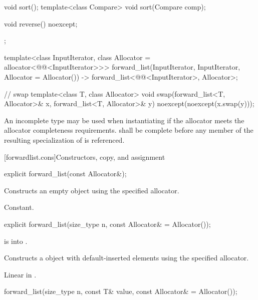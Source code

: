 \begin{codeblock}
{{    void sort();
    template<class Compare> void sort(Compare comp);

    void reverse() noexcept;
  };

  template<class InputIterator, class Allocator = allocator<@@<InputIterator>>>
    forward_list(InputIterator, InputIterator, Allocator = Allocator())
      -> forward_list<@@<InputIterator>, Allocator>;

  // swap
  template<class T, class Allocator>
    void swap(forward_list<T, Allocator>& x, forward_list<T, Allocator>& y)
      noexcept(noexcept(x.swap(y)));
}
\end{codeblock}

\pnum
An incomplete type  may be used when instantiating 
if the allocator meets the
allocator completeness requirements.
 shall be complete before any member of the resulting specialization
of  is referenced.

[forwardlist.cons]{Constructors, copy, and assignment}

%
\begin{itemdecl}
explicit forward_list(const Allocator&);
\end{itemdecl}

\begin{itemdescr}
\pnum
\effects
Constructs an empty  object using the specified allocator.

\pnum
\complexity
Constant.
\end{itemdescr}

%
\begin{itemdecl}
explicit forward_list(size_type n, const Allocator& = Allocator());
\end{itemdecl}

\begin{itemdescr}
\pnum
\expects
{} is  into .

\pnum
\effects
Constructs a  object with 
default-inserted elements using the specified allocator.

\pnum
\complexity
Linear in .
\end{itemdescr}

%
\begin{itemdecl}
forward_list(size_type n, const T& value, const Allocator& = Allocator());
\end{itemdecl}


